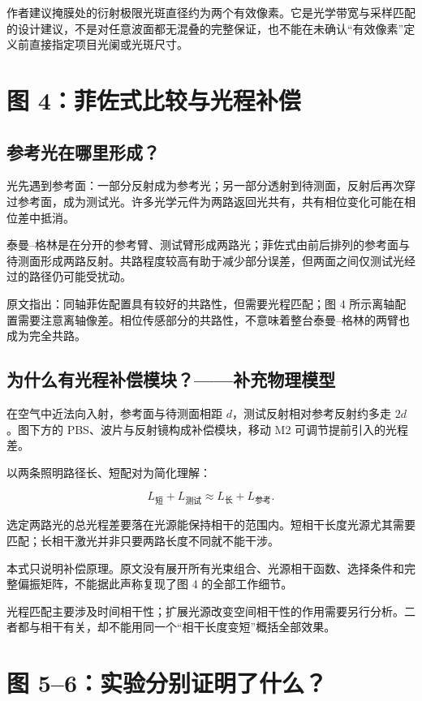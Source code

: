 \documentclass[UTF8,fontset=fandol,11pt,a4paper]{ctexart}
\begin{document}
作者建议掩膜处的衍射极限光斑直径约为两个有效像素。它是光学带宽与采样匹配的设计建议，不是对任意波面都无混叠的完整保证，也不能在未确认“有效像素”定义前直接指定项目光阑或光斑尺寸。

\section{图 4：菲佐式比较与光程补偿}

\subsection{参考光在哪里形成？}

光先遇到参考面：一部分反射成为参考光；另一部分透射到待测面，反射后再次穿过参考面，成为测试光。许多光学元件为两路返回光共有，共有相位变化可能在相位差中抵消。

泰曼–格林是在分开的参考臂、测试臂形成两路光；菲佐式由前后排列的参考面与待测面形成两路反射。共路程度较高有助于减少部分误差，但两面之间仅测试光经过的路径仍可能受扰动。

原文指出：同轴菲佐配置具有较好的共路性，但需要光程匹配；图 4 所示离轴配置需要注意离轴像差。相位传感部分的共路性，不意味着整台泰曼–格林的两臂也成为完全共路。

\subsection{为什么有光程补偿模块？——补充物理模型}

在空气中近法向入射，参考面与待测面相距 \(d\)，测试反射相对参考反射约多走 \(2d\)。图下方的 PBS、波片与反射镜构成补偿模块，移动 M2 可调节提前引入的光程差。

以两条照明路径长、短配对为简化理解：

\[
L_{\mathrm{短}}+L_{\mathrm{测试}}\approx L_{\mathrm{长}}+L_{\mathrm{参考}}.
\]

选定两路光的总光程差要落在光源能保持相干的范围内。短相干长度光源尤其需要匹配；长相干激光并非只要两路长度不同就不能干涉。

本式只说明补偿原理。原文没有展开所有光束组合、光源相干函数、选择条件和完整偏振矩阵，不能据此声称复现了图 4 的全部工作细节。

光程匹配主要涉及时间相干性；扩展光源改变空间相干性的作用需要另行分析。二者都与相干有关，却不能用同一个“相干长度变短”概括全部效果。

\section{图 5–6：实验分别证明了什么？}
\end{document}
